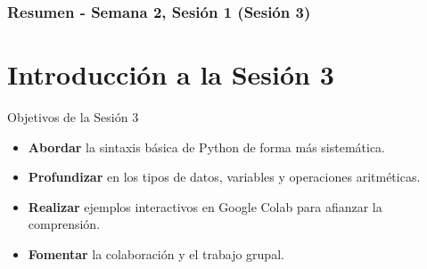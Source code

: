 \documentclass[10pt]{beamer}
\begin{document}
\myfront{}

\begin{frame}
  \titlepage
\end{frame}

\begin{frame}
  \frametitle{Resumen - Semana 2, Sesión 1 (Sesión 3)}
  \tableofcontents
\end{frame}


\section{Introducción a la Sesión 3}

\begin{frame}{Objetivos de la Sesión 3}
  \begin{itemize}
    \item \textbf{Abordar} la sintaxis básica de Python de forma más sistemática.
    \item \textbf{Profundizar} en los tipos de datos, variables y operaciones aritméticas.
    \item \textbf{Realizar} ejemplos interactivos en Google Colab para afianzar la comprensión.
    \item \textbf{Fomentar} la colaboración y el trabajo grupal.
  \end{itemize}
\end{frame}
\end{document}
